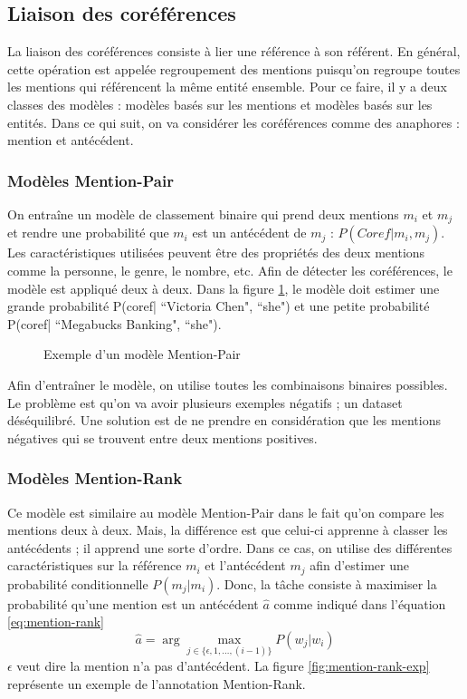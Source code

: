 \documentclass{KodeBook}
\begin{document}
\subsection{Liaison des coréférences}

La liaison des coréférences consiste à lier une référence à son référent. 
En général, cette opération est appelée regroupement des mentions puisqu'on regroupe toutes les mentions qui référencent la même entité ensemble. 
Pour ce faire, il y a deux classes des modèles : modèles basés sur les mentions et modèles basés sur les entités. 
Dans ce qui suit, on va considérer les coréférences comme des anaphores : mention et antécédent.

\subsubsection{Modèles Mention-Pair}

On entraîne un modèle de classement binaire qui prend deux mentions $m_i$ et $m_j$ et rendre une probabilité que $m_i$ est un antécédent de $m_j$ : $P(Coref|m_i, m_j)$. 
Les caractéristiques utilisées peuvent être des propriétés des deux mentions comme la personne, le genre, le nombre, etc.
Afin de détecter les coréférences, le modèle est appliqué deux à deux.
Dans la figure \ref{fig:mention-pair-exp}, le modèle doit estimer une grande probabilité P(coref| ``Victoria Chen", ``she") et une petite probabilité P(coref| ``Megabucks Banking", ``she").

\begin{figure}[ht]
	\centering
	\caption[Exemple d'un modèle Mention-Pair]{Exemple d'un modèle Mention-Pair \cite{2019-jurafsky-martin}}
	\label{fig:mention-pair-exp}
\end{figure}

Afin d'entraîner le modèle, on utilise toutes les combinaisons binaires possibles.
Le problème est qu'on va avoir plusieurs exemples négatifs ; un dataset déséquilibré. 
Une solution est de ne prendre en considération que les mentions négatives qui se trouvent entre deux mentions positives.

\subsubsection{Modèles Mention-Rank}

Ce modèle est similaire au modèle Mention-Pair dans le fait qu'on compare les mentions deux à deux. 
Mais, la différence est que celui-ci apprenne à classer les antécédents ; il apprend une sorte d'ordre. 
Dans ce cas, on utilise des différentes caractéristiques sur la référence $m_i$ et l'antécédent $m_j$ afin d'estimer une probabilité conditionnelle $P(m_j|m_i)$.
Donc, la tâche consiste à maximiser la probabilité qu'une mention est un antécédent $\hat{a}$ comme indiqué dans l'équation \ref{eq:mention-rank}
\begin{equation}\label{eq:mention-rank}
\hat{a} = \arg\max_{j \in \{\epsilon, 1, \ldots, (i-1)\}} P(w_j|w_i) 
\end{equation}
$\epsilon$ veut dire la mention n'a pas d'antécédent. 
La figure \ref{fig:mention-rank-exp} représente un exemple de l'annotation Mention-Rank.
\end{document}
